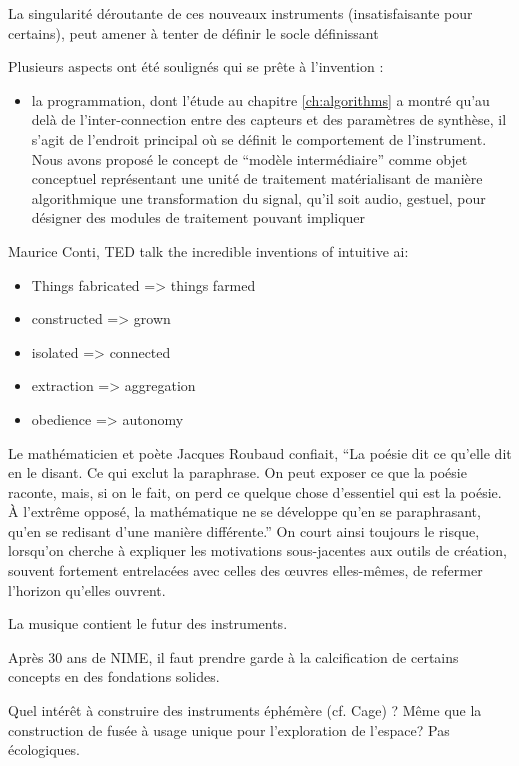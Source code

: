 La singularité déroutante de ces nouveaux instruments (insatisfaisante pour certains), peut amener à tenter de définir le socle définissant



Plusieurs aspects ont été soulignés qui se prête à l'invention : 
\vspace{-1em}
\begin{itemize}[noitemsep]
	\item la programmation, dont l'étude au chapitre \ref{ch:algorithms} a montré qu'au delà de l'inter-connection entre des capteurs et des paramètres de synthèse, il s'agit de l'endroit principal où se définit le comportement de l'instrument. Nous avons proposé le concept de ``modèle intermédiaire'' comme objet conceptuel représentant une unité de traitement matérialisant de manière algorithmique une transformation du signal, qu'il soit audio, gestuel, pour désigner des modules de traitement pouvant impliquer 
\end{itemize}

Maurice Conti, TED talk the incredible inventions of intuitive ai:
\vspace{-1em}
\begin{itemize}[noitemsep]
	\item Things fabricated => things farmed
	\item constructed => grown
	\item isolated => connected
	\item extraction => aggregation
	\item obedience => autonomy
\end{itemize}


Le mathématicien et poète Jacques Roubaud confiait, ``La poésie dit ce qu’elle dit en le disant. Ce qui exclut la paraphrase. On peut exposer ce que la poésie raconte, mais, si on le fait, on perd ce quelque chose d’essentiel qui est la poésie. À l’extrême opposé, la mathématique ne se développe qu’en se paraphrasant, qu’en se redisant d’une manière différente.''
On court ainsi toujours le risque, lorsqu'on cherche à expliquer les motivations sous-jacentes aux outils de création, souvent fortement entrelacées avec celles des œuvres elles-mêmes, de refermer l'horizon qu'elles ouvrent.

La musique contient le futur des instruments.


Après 30 ans de NIME, il faut prendre garde à la calcification de certains concepts en des fondations solides. 

Quel intérêt à construire des instruments éphémère (cf. Cage) ?
Même que la construction de fusée à usage unique pour l'exploration de l'espace?
Pas écologiques.


